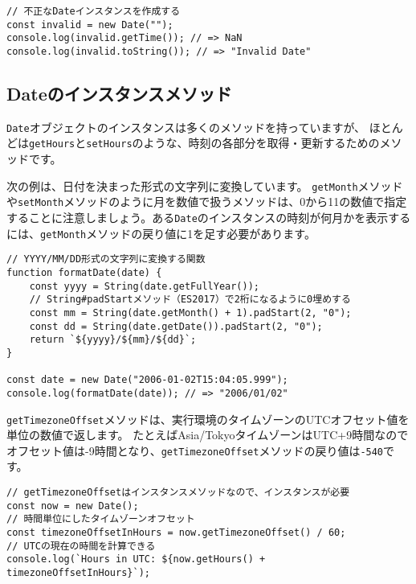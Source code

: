 \begin{lstlisting}
// 不正なDateインスタンスを作成する
const invalid = new Date("");
console.log(invalid.getTime()); // => NaN
console.log(invalid.toString()); // => "Invalid Date"
\end{lstlisting}

\hypertarget{instance-method}{%
\subsection{Dateのインスタンスメソッド}\label{instance-method}}

\texttt{Date}オブジェクトのインスタンスは多くのメソッドを持っていますが、
ほとんどは\texttt{getHours}と\texttt{setHours}のような、時刻の各部分を取得・更新するためのメソッドです。

次の例は、日付を決まった形式の文字列に変換しています。
\texttt{getMonth}メソッドや\texttt{setMonth}メソッドのように月を数値で扱うメソッドは、0から11の数値で指定することに注意しましょう。ある\texttt{Date}のインスタンスの時刻が何月かを表示するには、\texttt{getMonth}メソッドの戻り値に1を足す必要があります。

\begin{lstlisting}
// YYYY/MM/DD形式の文字列に変換する関数
function formatDate(date) {
    const yyyy = String(date.getFullYear());
    // String#padStartメソッド（ES2017）で2桁になるように0埋めする
    const mm = String(date.getMonth() + 1).padStart(2, "0");
    const dd = String(date.getDate()).padStart(2, "0");
    return `${yyyy}/${mm}/${dd}`;
}

const date = new Date("2006-01-02T15:04:05.999");
console.log(formatDate(date)); // => "2006/01/02"
\end{lstlisting}

\texttt{getTimezoneOffset}メソッドは、実行環境のタイムゾーンのUTC\textbf{}オフセット値を\textbf{}単位の数値で返します。
たとえばAsia/TokyoタイムゾーンはUTC+9時間なのでオフセット値は-9時間となり、\texttt{getTimezoneOffset}メソッドの戻り値は\texttt{-540}です。

\begin{lstlisting}
// getTimezoneOffsetはインスタンスメソッドなので、インスタンスが必要
const now = new Date();
// 時間単位にしたタイムゾーンオフセット
const timezoneOffsetInHours = now.getTimezoneOffset() / 60;
// UTCの現在の時間を計算できる
console.log(`Hours in UTC: ${now.getHours() + timezoneOffsetInHours}`);
\end{lstlisting}

